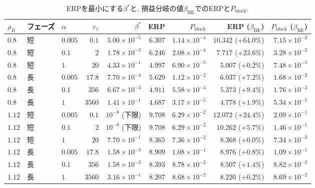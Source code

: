 \documentclass[a4paper, 11pt, dvipdfmx]{jsreport}
\begin{document}
\begin{table}[H]
\centering
\caption{ERPを最小にする$\beta^*$と, 損益分岐の値$\beta_{\mathrm{BE}}$でのERPと$P_{\mathrm{block}}$.}
\label{tab:exp2-optimum}
\small
\begin{tabular}{lllrrrrrr}
\toprule
$\rho_B$ & フェーズ & $\alpha$ & $r_1$ & $\beta^*$ & ERP & $P_{\mathrm{block}}$ & ERP ($\beta_{\mathrm{BE}}$) & $P_{\mathrm{block}}$ ($\beta_{\mathrm{BE}}$) \\
\midrule
$0.8$ & 短 & $0.005$ & $0.1$ & $5.00 \times 10^{-5}$ & $6.307$ & $1.14 \times 10^{-4}$ & $10.342$ ($+64.0\%$) & $7.15 \times 10^{-2}$ \\
$0.8$ & 短 & $0.1$ & $2$ & $1.78 \times 10^{-3}$ & $6.246$ & $2.08 \times 10^{-4}$ & $7.717$ ($+23.6\%$) & $3.28 \times 10^{-2}$ \\
$0.8$ & 短 & $1$ & $20$ & $4.33 \times 10^{-1}$ & $4.997$ & $6.90 \times 10^{-5}$ & $5.007$ ($+0.2\%$) & $7.48 \times 10^{-5}$ \\
$0.8$ & 長 & $0.005$ & $17.8$ & $7.70 \times 10^{-4}$ & $5.629$ & $1.12 \times 10^{-2}$ & $6.037$ ($+7.2\%$) & $1.68 \times 10^{-2}$ \\
$0.8$ & 長 & $0.1$ & $356$ & $6.67 \times 10^{-3}$ & $4.911$ & $5.58 \times 10^{-4}$ & $5.373$ ($+9.4\%$) & $1.76 \times 10^{-3}$ \\
$0.8$ & 長 & $1$ & $3560$ & $1.41 \times 10^{-1}$ & $4.687$ & $3.17 \times 10^{-5}$ & $4.778$ ($+1.9\%$) & $5.34 \times 10^{-5}$ \\
\midrule
$1.12$ & 短 & $0.005$ & $0.1$ & $10^{-8}$ (下限) & $9.708$ & $6.29 \times 10^{-2}$ & $12.072$ ($+24.4\%$) & $2.09 \times 10^{-1}$ \\
$1.12$ & 短 & $0.1$ & $2$ & $10^{-8}$ (下限) & $9.708$ & $6.29 \times 10^{-2}$ & $10.262$ ($+5.7\%$) & $1.46 \times 10^{-1}$ \\
$1.12$ & 短 & $1$ & $20$ & $7.70 \times 10^{-1}$ & $8.365$ & $7.36 \times 10^{-2}$ & $8.368$ ($+0.0\%$) & $7.34 \times 10^{-2}$ \\
$1.12$ & 長 & $0.005$ & $17.8$ & $1.58 \times 10^{-3}$ & $8.909$ & $1.08 \times 10^{-1}$ & $8.976$ ($+0.8\%$) & $1.09 \times 10^{-1}$ \\
$1.12$ & 長 & $0.1$ & $356$ & $1.58 \times 10^{-2}$ & $8.393$ & $8.78 \times 10^{-2}$ & $8.507$ ($+1.4\%$) & $8.82 \times 10^{-2}$ \\
$1.12$ & 長 & $1$ & $3560$ & $3.16 \times 10^{-1}$ & $8.207$ & $8.68 \times 10^{-2}$ & $8.220$ ($+0.2\%$) & $8.69 \times 10^{-2}$ \\
\bottomrule
\end{tabular}
\end{table}
\end{document}
